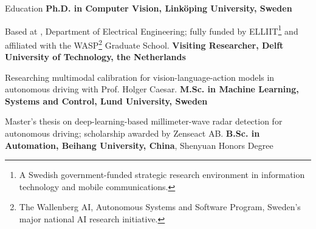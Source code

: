 \begin{rubric}{Education}
%
	\textbf{Ph.D. in Computer Vision, Linköping University, Sweden}
	\par Based at , Department of Electrical Engineering; fully funded by ELLIIT\footnote{A Swedish government-funded strategic research environment in information technology and mobile communications.} and affiliated with the WASP\footnote{The Wallenberg AI, Autonomous Systems and Software Program, Sweden's major national AI research initiative.} Graduate School.
%
	\textbf{Visiting Researcher, Delft University of Technology, the Netherlands}
	\par Researching multimodal calibration for vision-language-action models in autonomous driving with Prof. Holger Caesar.
%
	\textbf{M.Sc. in Machine Learning, Systems and Control, Lund University, Sweden}
	\par Master's thesis on deep-learning-based millimeter-wave radar detection for autonomous driving; scholarship awarded by Zenseact AB.
%
	\textbf{B.Sc. in Automation, Beihang University, China}, Shenyuan Honors Degree
\end{rubric}